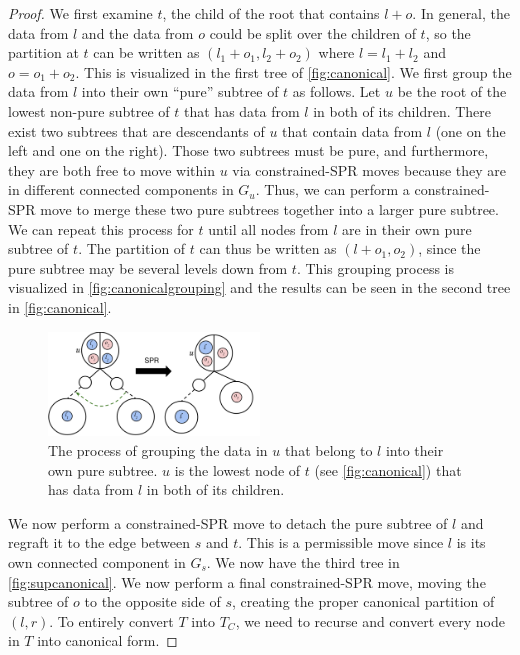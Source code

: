 \begin{proof}
We first examine $t$, the child of the root that contains $l + o$.
In general, the data from $l$ and the data from $o$ could
be split over the children of $t$, so the partition at $t$
can be written as $(l_1 + o_1, l_2 + o_2)$ where $l = l_1 + l_2$ 
and $o = o_1 + o_2$. This is visualized in the first
tree of \autoref{fig:canonical}.
We first group the data from $l$ into their own ``pure'' subtree
of $t$ as follows.
Let $u$ be the root of the
lowest non-pure subtree of $t$ that has
data from $l$ in both of its children.
There exist two subtrees that are descendants of $u$ 
that contain data from $l$ (one on the left and one on the right).
Those two subtrees
must be pure, and furthermore, they are both free to
move within $u$ via constrained-SPR moves because
they are in different connected components in $G_u$.
Thus, we can perform a constrained-SPR move to merge these
two pure subtrees together into a larger pure subtree.
We can repeat this process for $t$ until all nodes
from $l$ are in their own pure subtree of $t$.
The partition of $t$ can thus be written as
$(l + o_1, o_2)$, since the pure subtree may be several
levels down from $t$. This grouping process is visualized in
\autoref{fig:canonicalgrouping} and the results can be
seen in the second
tree in \autoref{fig:canonical}.

\begin{figure}
    \centering
    \includegraphics[width=0.5\textwidth]{img/ibhc/CanonicalTreeGrouping}
    \caption{The process of grouping the data in $u$
    that belong to $l$ into their own pure subtree. $u$ is the
    lowest node of $t$ (see \autoref{fig:canonical}) that has data from $l$
    in both of its children.}
    \label{fig:canonicalgrouping}
\end{figure}


We now perform a constrained-SPR move to detach
the pure subtree of $l$ and regraft it to
the edge between $s$ and $t$. This is a permissible
move since $l$ is its own connected component in 
$G_s$. We now have the third tree in \autoref{fig:supcanonical}.
We now perform a final constrained-SPR
move, moving the subtree of $o$ to the opposite
side of $s$, creating the proper canonical partition
of $(l, r)$.
To entirely convert $T$ into $T_C$, we need to recurse
and convert every node in $T$ into canonical form.


\end{proof}
